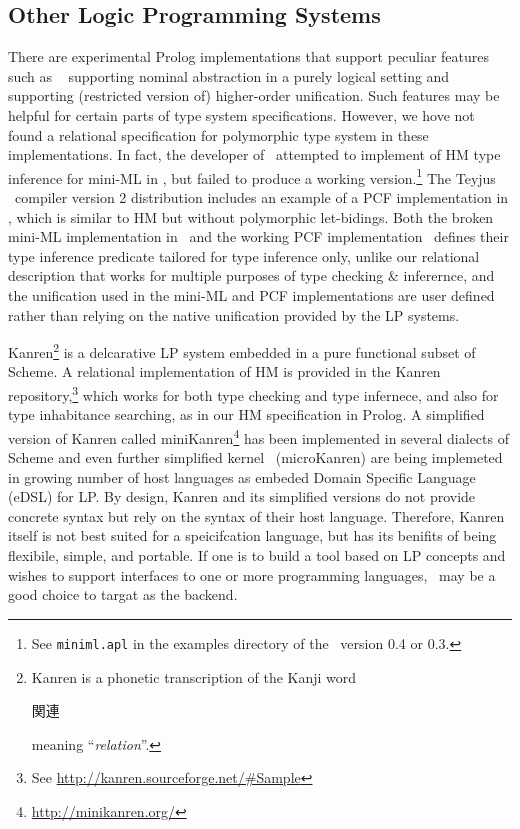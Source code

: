 \subsection{Other Logic Programming Systems}\label{ssec:otherLP}
There are experimental Prolog implementations that support peculiar features
such as \aProlog\ \cite{cheney04iclp} supporting nominal abstraction in a purely
logical setting and \lProlog\ \cite{nadathur99cade} supporting (restricted
version of) higher-order unification. Such features may be helpful for certain
parts of type system specifications. However, we hove not found a relational
specification for polymorphic type system in these implementations. In fact,
the developer of \aProlog\ attempted to implement of HM type inference for
mini-ML in \aProlog, but failed to produce a working version.\footnote{
	See \texttt{miniml.apl} in the examples directory of
	the \aProlog\ version 0.4 or 0.3.}
The Teyjus \lProlog\ compiler version 2 distribution includes an example of
a PCF implementation in \lProlog, which is similar to HM but without
polymorphic let-bidings. Both the broken mini-ML implementation in \aProlog\ and
the working PCF implementation \lProlog\ defines their type inference predicate
tailored for type inference only, unlike our relational description that works
for multiple purposes of type checking \& inferernce, and the unification used
in the mini-ML and PCF implementations are user defined rather than relying on
the native unification provided by the LP systems.

Kanren\footnote{Kanren is a phonetic transcription of the Kanji word
	\begin{CJK}{UTF8}{min}{関連}\end{CJK} meaning ``\emph{relation}''.}
is a delcarative LP system embedded in a pure functional subset of Scheme.
A relational implementation of HM is provided in
the Kanren repository,\footnote{See \url{http://kanren.sourceforge.net/\#Sample}}
which works for both type checking and type infernece, and also for
type inhabitance searching, as in our HM specification in Prolog.
A simplified version of Kanren called miniKanren\footnote{
	\url{http://minikanren.org/} } has been implemented in several dialects
of Scheme and even further simplified kernel \muKanren\ (microKanren)
\cite{microKanren} are being implemeted in growing number of host languages as
embeded Domain Specific Language (eDSL) for LP. By design, Kanren and its
simplified versions do not provide concrete syntax but rely on the syntax of
their host language. Therefore, Kanren itself is not best suited for
a speicifcation language, but has its benifits of being flexibile, simple, and
portable. If one is to build a tool based on LP concepts and wishes to support
interfaces to one or more programming languages, \muKanren\ may be a good choice
to targat as the backend.

